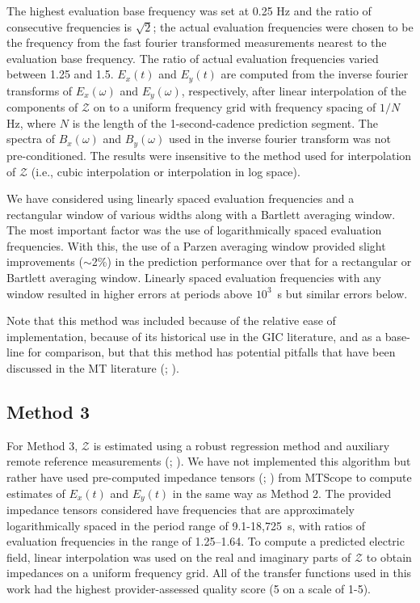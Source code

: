 \documentclass[12pt]{article}
\begin{document}
The highest evaluation base frequency was set at 0.25 Hz and the ratio of consecutive frequencies is $\sqrt{2}$; the actual evaluation frequencies were chosen to be the frequency from the fast fourier transformed measurements nearest to the evaluation base frequency. The ratio of actual evaluation frequencies varied between 1.25 and 1.5.  $E_x(t)$ and $E_y(t)$ are computed from the inverse fourier transforms of $E_x(\omega)$ and $E_y(\omega)$, respectively, after linear interpolation of the components of $\mathcal{Z}$ on to a uniform frequency grid with frequency spacing of $1/N$ Hz, where $N$ is the length of the 1-second-cadence prediction segment.  The spectra of $B_x(\omega)$ and $B_y(\omega)$ used in the inverse fourier transform was not pre-conditioned.  The results were insensitive to the method used for interpolation of $\mathcal{Z}$ (i.e., cubic interpolation or interpolation in log space).

We have considered using linearly spaced evaluation frequencies and a rectangular window of various widths along with a Bartlett averaging window.  The most important factor was the use of logarithmically spaced evaluation frequencies.  With this, the use of a Parzen averaging window provided slight improvements ($\sim$2\%) in the prediction performance over that for a rectangular or Bartlett averaging window.  Linearly spaced evaluation frequencies with any window resulted in higher errors at periods above $10^3$~s but similar errors below.  

Note that this method was included because of the relative ease of implementation, because of its historical use in the GIC literature, and as a base-line for comparison, but that this method has potential pitfalls that have been discussed in the MT literature (\cite{Egbert1986}; \cite{Eisel2001}).

\subsection{Method 3}

For Method 3, $\mathcal{Z}$ is estimated using a robust regression method and auxiliary remote reference measurements (\cite{Egbert1986}; \cite{Eisel2001}).  We have not implemented this algorithm but rather have used pre-computed impedance tensors (\cite{Kelbert2011}; \cite{Schultz2016}) from MTScope to compute estimates of $E_x(t)$ and $E_y(t)$ in the same way as Method 2.  The provided impedance tensors considered have frequencies that are approximately logarithmically spaced in the period range of 9.1-18,725~s, with ratios of evaluation frequencies in the range of 1.25--1.64.  To compute a predicted electric field, linear interpolation was used on the real and imaginary parts of $\mathcal{Z}$ to obtain impedances on a uniform frequency grid.  All of the transfer functions used in this work had the highest provider-assessed quality score (5 on a scale of 1-5).
\end{document}
